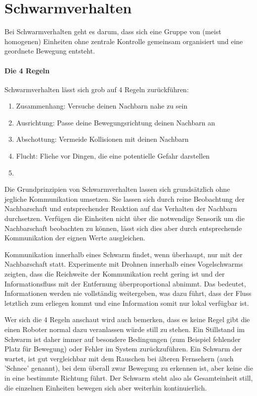 \section{Schwarmverhalten}\label{sec:Schwarmverhalten}

Bei Schwarmverhalten geht es darum, dass sich eine Gruppe von (meist homogenen) Einheiten ohne zentrale Kontrolle gemeinsam organisiert und eine geordnete Bewegung entsteht.

\paragraph*{Die 4 Regeln}\label{4Rules}
Schwarmverhalten lässt sich grob auf 4 Regeln zurückführen:

\begin{enumerate}
	\item Zusammenhang: Versuche deinen Nachbarn nahe zu sein
	\item Ausrichtung: Passe deine Bewegungsrichtung deinen Nachbarn an
	\item Abschottung: Vermeide Kollisionen mit deinen Nachbarn
	\item Flucht: Fliehe vor Dingen, die eine potentielle Gefahr darstellen
	\item {}
\end{enumerate}

Die Grundprinzipien von Schwarmverhalten lassen sich grundsätzlich ohne jegliche Kommunikation umsetzen.
Sie lassen sich durch reine Beobachtung der Nachbarschaft und entsprechender Reaktion auf das Verhalten der Nachbarn durchsetzen.
Verfügen die Einheiten nicht über die notwendige Sensorik um die Nachbarschaft beobachten zu können, lässt sich dies aber durch entsprechende Kommunikation der eignen Werte ausgleichen.

Kommunikation innerhalb eines Schwarm findet, wenn überhaupt, nur mit der Nachbarschaft statt.
Experimente mit Drohnen innerhalb eines Vogelschwarms zeigten, dass die Reichweite der Kommunikation recht gering ist und der Informationsfluss mit der Entfernung überproportional abnimmt.
Das bedeutet, Informationen werden nie vollständig weitergeben, was dazu führt, dass der Fluss letztlich zum erliegen kommt und eine Information somit nur lokal verfügbar ist.

Wer sich die 4 Regeln anschaut wird auch bemerken, dass es keine Regel gibt die einen Roboter normal dazu veranlassen würde still zu stehen.
Ein Stillstand im Schwarm ist daher immer auf besondere Bedingungen (zum Beispiel fehlender Platz für Bewegung) oder Fehler im System zurückzuführen.
Ein Schwarm der wartet, ist gut vergleichbar mit dem Rauschen bei älteren Fernsehern (auch 'Schnee' genannt), bei dem überall zwar Bewegung zu erkennen ist, aber keine die in eine bestimmte Richtung führt.
Der Schwarm steht also als Gesamteinheit still, die einzelnen Einheiten bewegen sich aber weiterhin kontinuierlich.

